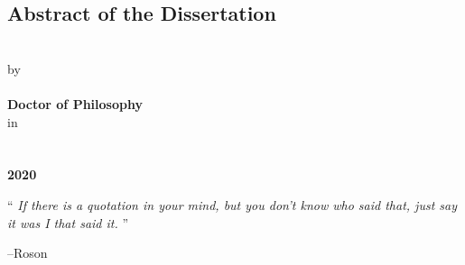 \documentclass[
12pt, %
oneside, %
english, %
doublespacing, %
liststotoc, %
]{main} %
\begin{document}
\begin{singlespace}
\begin{center}
\end{center}


\renewcommand{\abstractname}{Abstract of the Dissertation}
\begin{center}
	\section*{\abstractname}

		\textbf{\ttitle} \\ [0.5cm]
		by  \\ [0.5cm]
		\textbf{\authorname} \\ [0.5cm]
		\textbf{Doctor of Philosophy} \\ [0.5cm]
		in \\ [0.5cm]
		\textbf{\deptname}  \\ [0.5cm]
		\univname  \\ [0.5cm]
		\textbf{2020}  \\ [0.5cm]
\end{center}


\end{singlespace}
\newpage



\vspace*{0.2\textheight}

\noindent\enquote{\itshape 
If there is a quotation in your mind, but you don't know who said that, just say it was I that said it.
}\bigbreak

\hfill --Roson


\tableofcontents %
\end{document}
